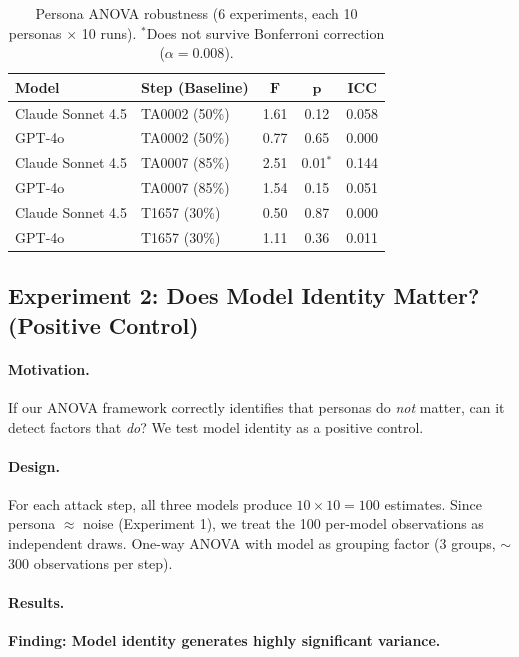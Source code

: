\begin{table}[t]
\centering
\caption{Persona ANOVA robustness (6 experiments, each 10 personas $\times$ 10 runs). $^*$Does not survive Bonferroni correction ($\alpha = 0.008$).}
\label{tab:persona-robustness}
\small
\begin{tabular}{llccc}
\toprule
\textbf{Model} & \textbf{Step (Baseline)} & $\boldsymbol{F}$ & $\boldsymbol{p}$ & \textbf{ICC} \\
\midrule
Claude Sonnet 4.5 & TA0002 (50\%) & 1.61 & 0.12  & 0.058 \\
GPT-4o            & TA0002 (50\%) & 0.77 & 0.65  & 0.000 \\
\midrule
Claude Sonnet 4.5 & TA0007 (85\%) & 2.51 & 0.01$^*$ & 0.144 \\
GPT-4o            & TA0007 (85\%) & 1.54 & 0.15  & 0.051 \\
\midrule
Claude Sonnet 4.5 & T1657\phantom{0} (30\%) & 0.50 & 0.87  & 0.000 \\
GPT-4o            & T1657\phantom{0} (30\%) & 1.11 & 0.36  & 0.011 \\
\bottomrule
\end{tabular}
\end{table}


\subsection{Experiment 2: Does Model Identity Matter? (Positive Control)}
\label{sec:cross-model-variance}

\paragraph{Motivation.}
If our ANOVA framework correctly identifies that personas do \emph{not} matter, can it detect factors that \emph{do}? We test model identity as a positive control.

\paragraph{Design.}
For each attack step, all three models produce $10 \times 10 = 100$ estimates. Since persona $\approx$ noise (Experiment 1), we treat the 100 per-model observations as independent draws. One-way ANOVA with model as grouping factor (3 groups, $\sim$300 observations per step).

\paragraph{Results.}
\textbf{Finding: Model identity generates highly significant variance.}

